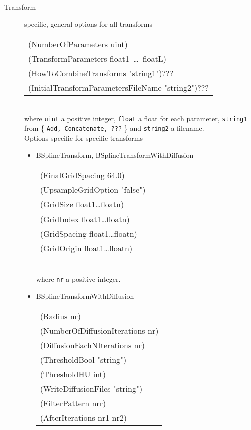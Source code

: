 \documentclass[a4paper]{article}
\newenvironment{Tabular}[1]{\ttfamily \begin{tabular}{#1}}{\end{tabular}}
\begin{document}
\begin{description}
\item[Transform] specific, general options for all transforms\\
    \begin{Tabular}{l}
    (NumberOfParameters uint) \\
    (TransformParameters float1~\ldots~floatL) \\
    (HowToCombineTransforms "string1")??? \\
    (InitialTransformParametersFileName "string2")??? \\
    \end{Tabular}\\
where \texttt{uint} a positive integer, \texttt{float} a float for each parameter,
\texttt{string1} from \{ \texttt{Add, Concatenate, ???} \} and \texttt{string2} a filename.\\
Options specific for specific transforms
    \begin{itemize}
    \item BSplineTransform, BSplineTransformWithDiffusion\\
        \begin{Tabular}{l}
        (FinalGridSpacing 64.0) \\
        (UpsampleGridOption "false") \\
        (GridSize float1\ldots floatn) \\
        (GridIndex float1\ldots floatn) \\
        (GridSpacing float1\ldots floatn) \\
        (GridOrigin float1\ldots floatn) \\
        \end{Tabular}\\
    where \texttt{nr} a positive integer.
    \item BSplineTransformWithDiffusion\\
        \begin{Tabular}{l}
        (Radius nr) \\
        (NumberOfDiffusionIterations nr) \\
        (DiffusionEachNIterations nr) \\
        (ThresholdBool "string") \\
        (ThresholdHU int) \\
        (WriteDiffusionFiles "string") \\
        (FilterPattern nrr) \\
        (AfterIterations nr1 nr2) \\

\end{Tabular}
\end{itemize}
\end{description}
\end{document}
